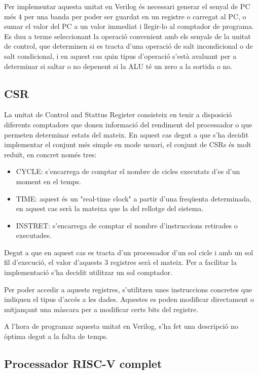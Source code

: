 \documentclass[10pt,a4paper,twocolumn,twoside]{article}
\begin{document}
    Per implementar aquesta unitat en Verilog és necessari generar el senyal de PC més 4 per una banda per poder ser guardat en un registre o carregat al PC, o sumar el valor del PC a un valor immediat i llegir-lo al comptador de programa. Es duu a terme seleccionant la operació convenient amb els senyals de la unitat de control, que determinen si es tracta d'una operació de salt incondicional o de salt condicional, i en aquest cas quin tipus d'operació s'està avaluant per a determinar si saltar o no depenent si la ALU té un zero a la sortida o no.
    
    
    \subsection{CSR}
    La unitat de Control and Stattus Register consisteix en tenir a disposició diferents comptadors que donen informació del rendiment del processador o que permeten determinar estats del mateix. 
    En aquest cas degut a que s'ha decidit implementar el conjunt més simple en mode usuari, el conjunt de CSRs és molt reduït, en concret només tres: 
    \begin{itemize}
        \item CYCLE: s'encarrega de comptar el nombre de cicles executats d'es d'un moment en el temps.
        \item TIME: aquest és un "real-time clock" a partir d'una freqüenta determinada, en aquest cas serà la mateixa que la del rellotge del sistema.
        \item INSTRET: s'encarrega de comptar el nombre d'instruccions retirades o executades.
    \end{itemize}
    
    Degut a que en aquest cas es tracta d'un processador d'un sol cicle i amb un sol fil d'execució, el valor d'aquests 3 registres serà el mateix. Per a facilitar la implementació s'ha decidit utilitzar un sol comptador.
    
    Per poder accedir a aquests registres, s'utilitzen unes instruccions concretes que indiquen el tipus d'accés a les dades. Aquestes es poden modificar directament o mitjançant una màscara per a modificar certs bits del registre.
    
    A l'hora de programar aquesta unitat en Verilog, s'ha fet una descripció no òptima degut a la falta de temps.
    

    
    \subsection{Processador RISC-V complet}
    
\end{document}
